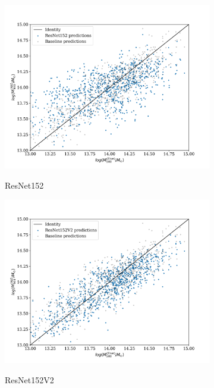 \begin{figure}[H]
\begin{subfigure}{.325\textwidth}
    \includegraphics[width=\linewidth]{images/Chapter4/Results/test_ResNet152_scatter.png}
    \label{fig:test_ResNet152_scatter}
    \caption{ResNet152}
\end{subfigure}
\begin{subfigure}{.325\textwidth}
    \centering
    \includegraphics[width=\linewidth]{images/Chapter4/Results/test_ResNet152V2_scatter.png}
    \label{fig:test_ResNet152V2_scatter}
    \caption{ResNet152V2}
\end{subfigure}
\begin{subfigure}{.325\textwidth}
    \centering

\end{subfigure}
\end{figure}
